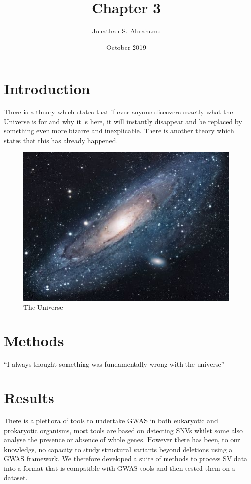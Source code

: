 \documentclass{article}
\title{Chapter 3}
\author{Jonathan S. Abrahams }
\date{October 2019}
\begin{document}
\maketitle

\section{Introduction}
There is a theory which states that if ever anyone discovers exactly what the Universe is for and why it is here, it will instantly disappear and be replaced by something even more bizarre and inexplicable.
There is another theory which states that this has already happened.

\begin{figure}[h!]
\centering
\includegraphics[scale=1.7]{universe}
\caption{The Universe}
\label{fig:universe}
\end{figure}

\section{Methods}
``I always thought something was fundamentally wrong with the universe'' \citep{adams1995hitchhiker}
\section{Results}

\newcommand{\quickwordcount}[1]{%
  \immediate\write18{texcount -1 -sum -merge -q #1.tex output.bbl > #1-words.sum }%
   words%
}
There is a plethora of tools to undertake GWAS in both eukaryotic and prokaryotic organisms, most tools are based on detecting SNVs whilst some also analyse the presence or absence of whole genes. However there has been, to our knowledge, no capacity to study structural variants beyond deletions using a GWAS framework. We therefore developed a suite of methods to process SV data into a format that is compatible with GWAS tools and then tested them on a dataset.
\end{document}
